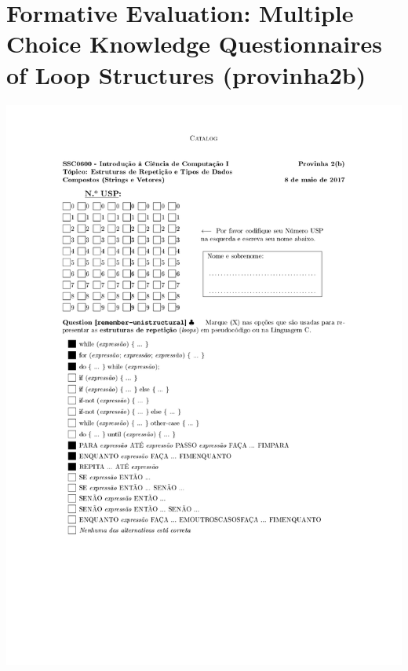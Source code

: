 \section{Formative Evaluation: Multiple Choice Knowledge Questionnaires of Loop Structures (provinha2b)}
\label{annex:second-study-pos}
\includegraphics[page=1,width=1\textwidth]{images/annex/second-study-pos.pdf}
\newpage
